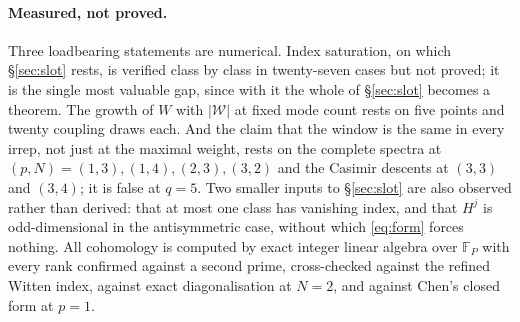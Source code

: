 \documentclass[10pt]{article}
\newcommand{\Wg}{\mathcal{W}}
\begin{document}
\paragraph{Measured, not proved.} Three loadbearing statements are numerical. Index saturation, on which
\S\ref{sec:slot} rests, is verified class by class in twenty-seven cases but not proved; it is the single most
valuable gap, since with it the whole of \S\ref{sec:slot} becomes a theorem. The growth of $W$ with $|\Wg|$ at
fixed mode count rests on five points and twenty coupling draws each. And the claim that the window is the same
in every irrep, not just at the maximal weight, rests on the complete spectra at $(p,N)=(1,3),(1,4),(2,3),(3,2)$
and the Casimir descents at $(3,3)$ and $(3,4)$; it is false at $q=5$. Two smaller inputs to \S\ref{sec:slot}
are also observed rather than derived: that at most one class has vanishing index, and that $H^j$ is
odd-dimensional in the antisymmetric case, without which \eqref{eq:form} forces nothing. All cohomology is
computed by exact integer linear algebra over $\mathbb F_P$ with every rank confirmed against a second prime,
cross-checked against the refined Witten index, against exact diagonalisation at $N=2$, and against Chen's
closed form at $p=1$.
\end{document}
